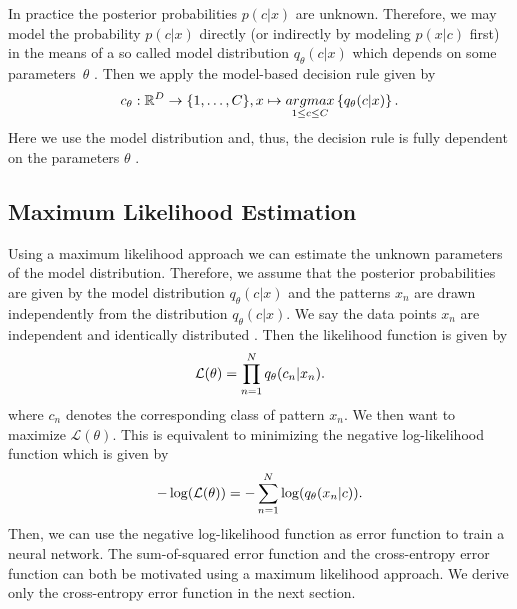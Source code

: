 In practice the posterior probabilities $p(c|x)$ are unknown. Therefore, we may model the probability $p(c|x)$ directly (or indirectly by modeling $p(x | c)$ first) in the means of a so called model distribution $q_\theta(c|x)$ which depends on some parameters~$\theta$ \cite[p.~637-638]{Ney:2003}. Then we apply the model-based decision rule given by
\begin{align}
\label{eq:decision-rule}
c_\theta:\mathbb{R}^D \rightarrow \{1, \ldots, C\}, x \mapsto \underset{1 \leq c \leq C}{argmax} \left\{q_\theta(c | x)\right\}\onedot
\end{align}
Here we use the model distribution and, thus, the decision rule is fully dependent on the parameters $\theta$ \cite[p.~638]{Ney:2003}.


\subsection{Maximum Likelihood Estimation}

Using a maximum likelihood approach we can estimate the unknown parameters of the model distribution. Therefore, we assume that the posterior probabilities are given by the model distribution $q_\theta(c | x)$ and the patterns $x_n$ are drawn independently from the distribution $q_\theta(c|x)$. We say the data points $x_n$ are independent and identically distributed \cite[p.~85-88]{DudaHartStork:2001}. Then the likelihood function is given by
\begin{align}
\mathcal{L}(\theta) = \prod _{n=1} ^N q_\theta(c_n | x_n)\onedot
\end{align}
where $c_n$ denotes the corresponding class of pattern $x_n$. We then want to maximize $\mathcal{L}(\theta)$. This is equivalent to minimizing the negative log-likelihood function which is given by
\begin{align}
- \log(\mathcal{L}(\theta)) = - \sum _{n=1} ^N \log(q_\theta(x_n | c))\onedot
\end{align}
Then, we can use the negative log-likelihood function as error function to train a neural network. The sum-of-squared error function and the cross-entropy error function can both be motivated using a maximum likelihood approach. We derive only the cross-entropy error function in the next section.

